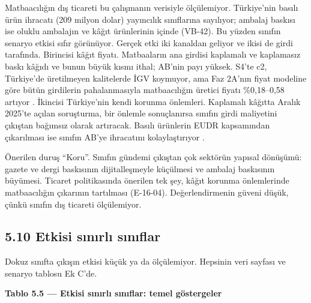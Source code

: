 Matbaacılığın dış ticareti bu çalışmanın verisiyle ölçülemiyor. Türkiye'nin basılı ürün ihracatı (209 milyon dolar) yayıncılık sınıflarına sayılıyor; ambalaj baskısı ise oluklu ambalajın ve kâğıt ürünlerinin içinde (VB-42). Bu yüzden sınıfın senaryo etkisi sıfır görünüyor. Gerçek etki iki kanaldan geliyor ve ikisi de girdi tarafında. Birincisi kâğıt fiyatı. Matbaaların ana girdisi kaplamalı ve kaplamasız baskı kâğıdı ve bunun büyük kısmı ithal; AB'nin payı yüksek. S4'te c2, Türkiye'de üretilmeyen kalitelerde İGV koymuyor, ama Faz 2A'nın fiyat modeline göre bütün girdilerin pahalanmasıyla matbaacılığın üretici fiyatı \%0,18--0,58 artıyor \etiketT{}. İkincisi Türkiye'nin kendi korunma önlemleri. Kaplamalı kâğıtta Aralık 2025'te açılan soruşturma, bir önlemle sonuçlanırsa sınıfın girdi maliyetini çıkıştan bağımsız olarak artıracak. Basılı ürünlerin EUDR kapsamından çıkarılması ise sınıfın AB'ye ihracatını kolaylaştırıyor \etiketV{}.

Önerilen duruş ``Koru''. Sınıfın gündemi çıkıştan çok sektörün yapısal dönüşümü: gazete ve dergi baskısının dijitalleşmeyle küçülmesi ve ambalaj baskısının büyümesi. Ticaret politikasında önerilen tek şey, kâğıt korunma önlemlerinde matbaacılığın çıkarının tartılması (E-16-04). Değerlendirmenin güveni düşük, çünkü sınıfın dış ticareti ölçülemiyor.

\hypertarget{nace_kartlar_16-18-510-etkisi-sux131nux131rlux131-sux131nux131flar}{%
\subsection{5.10 Etkisi sınırlı sınıflar}\label{nace_kartlar_16-18-510-etkisi-sux131nux131rlux131-sux131nux131flar}}

Dokuz sınıfta çıkışın etkisi küçük ya da ölçülemiyor. Hepsinin veri sayfası ve senaryo tablosu Ek C'de.


\textbf{Tablo 5.5 --- Etkisi sınırlı sınıflar: temel göstergeler}

\nopagebreak[4]

\begingroup\gbtablo\footnotesize

